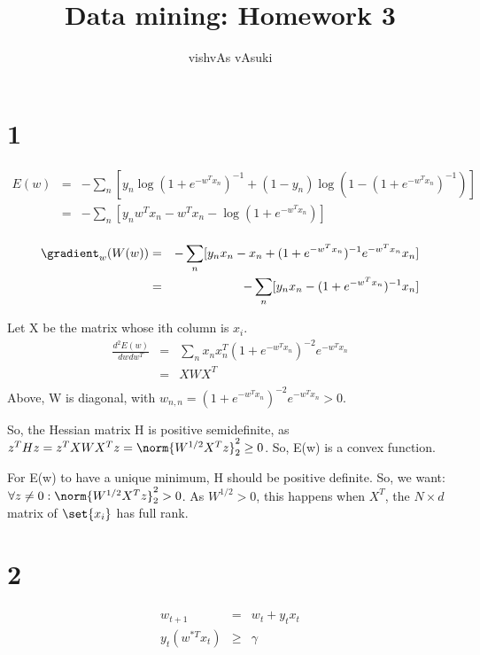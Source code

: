 \documentclass{article}
\title{Data mining: Homework 3}
\author{vishvAs vAsuki}
\begin{document}
\maketitle

\section{1}
\begin{eqnarray*}
E(w) &=& -\sum_{n}[y_{n}\log(1+e^{-w^{T}x_{n}})^{-1} + (1-y_{n})\log(1-(1+e^{-w^{T}x_{n}})^{-1})]\\
&=& -\sum_{n}[y_{n}w^{T}x_{n} - w^{T}x_{n} - \log(1+e^{-w^{T}x_{n}})]\\
\end{eqnarray*}

\begin{eqnarray*}
\gradient_{w}(W(w)) &=& -\sum_{n}[y_{n}x_{n} - x_{n} + (1+e^{-w^{T}x_{n}})^{-1}e^{-w^{T}x_{n}}x_{n} ]\\
&=& -\sum_{n}[y_{n}x_{n} - (1+e^{-w^{T}x_{n}})^{-1}x_{n}] \\
\end{eqnarray*}

Let X be the matrix whose ith column is $x_{i}$.
\begin{eqnarray*}
\frac{d^{2}E(w)}{dwdw^{T}} &=& \sum_{n} x_{n}x_{n}^{T}(1+e^{-w^{T}x_{n}})^{-2}e^{-w^{T}x_{n}}\\
&=& XWX^{T}\\
\end{eqnarray*}
Above, W is diagonal, with $w_{n,n} = (1+e^{-w^{T}x_{n}})^{-2}e^{-w^{T}x_{n}} > 0$.

So, the Hessian matrix H is positive semidefinite, as $z^{T}Hz = z^{T}XWX^{T}z = \norm{W^{1/2}X^{T}z}_{2}^{2} \geq 0$. So, E(w) is a convex function.

For E(w) to have a unique minimum, H should be positive definite. So, we want: $\forall z \neq 0: \norm{W^{1/2}X^{T}z}_{2}^{2} > 0$. As $W^{1/2}>0$, this happens when $X^{T}$, the $N \times d$ matrix of $\set{x_{i}}$ has full rank.

\section{2}
\begin{eqnarray*}
w_{t+1} &=& w_{t} + y_{t}x_{t}\\
y_{t}(w^{*T}x_{t}) &\geq& \gamma\\
\end{eqnarray*}
\end{document}
